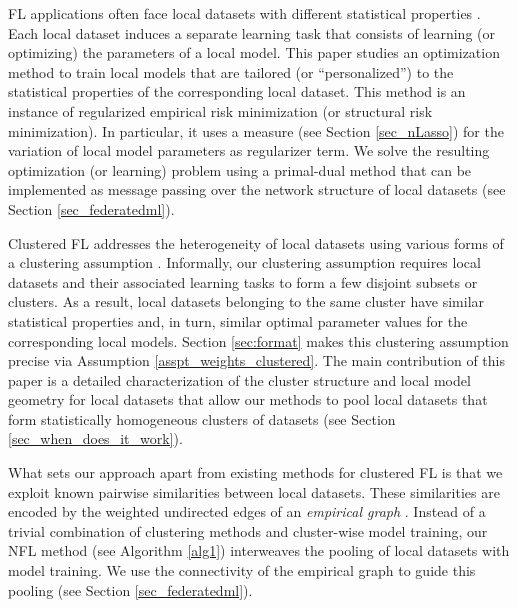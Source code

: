 \documentclass[lettersize,journal]{IEEEtran}
\begin{document}
FL applications often face local datasets with different statistical properties \cite{Ghosh2020}. 
Each local dataset induces a separate learning task that consists of learning (or optimizing) 
the parameters of a local model. This paper studies an optimization method to train local models 
that are tailored (or ``personalized'') to the statistical properties of the corresponding local dataset. This method 
is an instance of regularized empirical risk minimization (or structural risk minimization). In particular, it 
uses a measure (see Section \ref{sec_nLasso}) for the variation of local model parameters as regularizer term. We 
solve the resulting optimization (or learning) problem using a primal-dual method that can be implemented 
as message passing over the network structure of local datasets (see Section \ref{sec_federatedml}). 

Clustered FL addresses the heterogeneity of local datasets using various forms of a clustering 
assumption \cite{NIPS2008_fccb3cdc,Ghosh2020,SemiSupervisedBook}. Informally, our clustering 
assumption requires local datasets and their associated learning tasks to form a few disjoint
subsets or clusters. As a result, local datasets belonging to the same cluster have similar 
statistical properties and, in turn, similar optimal parameter values for the corresponding local models. 
Section \ref{sec:format} makes this clustering assumption precise via Assumption \ref{asspt_weights_clustered}. 
The main contribution of this paper is a detailed characterization of the cluster structure and local model 
geometry for local datasets that allow our methods to pool local datasets that form statistically 
homogeneous clusters of datasets (see Section \ref{sec_when_does_it_work}).

What sets our approach apart from existing methods for clustered FL \cite{Ghosh2020,NIPS2008_fccb3cdc} 
is that we exploit known pairwise similarities between local datasets. These similarities are encoded by 
the weighted undirected edges of an \emph{empirical graph} \cite{SemiSupervisedBook}. 
Instead of a trivial combination of clustering methods and cluster-wise model training, 
our NFL method (see Algorithm \ref{alg1}) interweaves the pooling of local datasets with 
model training. We use the connectivity of the empirical graph to guide this pooling (see Section \ref{sec_federatedml}).
\end{document}
